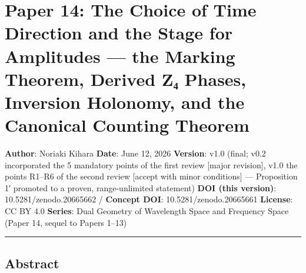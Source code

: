 \documentclass[
]{article}
\author{}
\date{}
\begin{document}
\section{Paper 14: The Choice of Time Direction and the Stage for
Amplitudes --- the Marking Theorem, Derived Z₄ Phases, Inversion
Holonomy, and the Canonical Counting
Theorem}\label{paper-14-the-choice-of-time-direction-and-the-stage-for-amplitudes-the-marking-theorem-derived-zux2084-phases-inversion-holonomy-and-the-canonical-counting-theorem}

\textbf{Author}: Noriaki Kihara \textbf{Date}: June 12, 2026
\textbf{Version}: v1.0 (final; v0.2 incorporated the 5 mandatory points
of the first review {[}major revision{]}, v1.0 the points R1--R6 of the
second review {[}accept with minor conditions{]} --- Proposition 1′
promoted to a proven, range-unlimited statement) \textbf{DOI (this
version)}: 10.5281/zenodo.20665662 / \textbf{Concept DOI}:
10.5281/zenodo.20665661 \textbf{License}: CC BY 4.0 \textbf{Series}:
Dual Geometry of Wavelength Space and Frequency Space (Paper 14, sequel
to Papers 1--13)

\begin{center}\rule{0.5\linewidth}{0.5pt}\end{center}

\subsection{Abstract}\label{abstract}
\end{document}
